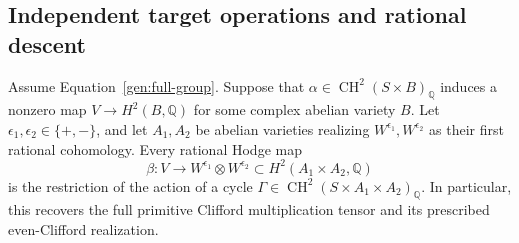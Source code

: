 \subsection{Independent target operations and rational descent}

\begin{theorem}\label{gen:generation}
Assume Equation~\eqref{gen:full-group}.  Suppose that
$\alpha\in\operatorname{CH}^2(S\times B)_{\mathbb Q}$ induces a
nonzero map $V\to H^2(B,\mathbb Q)$ for some complex abelian variety
$B$.  Let $\epsilon_1,\epsilon_2\in\{+,-\}$, and let $A_1,A_2$ be
abelian varieties realizing $W^{\epsilon_1},W^{\epsilon_2}$ as their
first rational cohomology.  Every rational Hodge map
\[
 \beta:V\longrightarrow W^{\epsilon_1}\otimes W^{\epsilon_2}
 \subset H^2(A_1\times A_2,\mathbb Q)
\]
is the restriction of the action of a cycle
$\Gamma\in\operatorname{CH}^2(S\times A_1\times A_2)_{\mathbb Q}$.
In particular, this recovers the full primitive Clifford
multiplication tensor and its prescribed even-Clifford realization.
\end{theorem}

